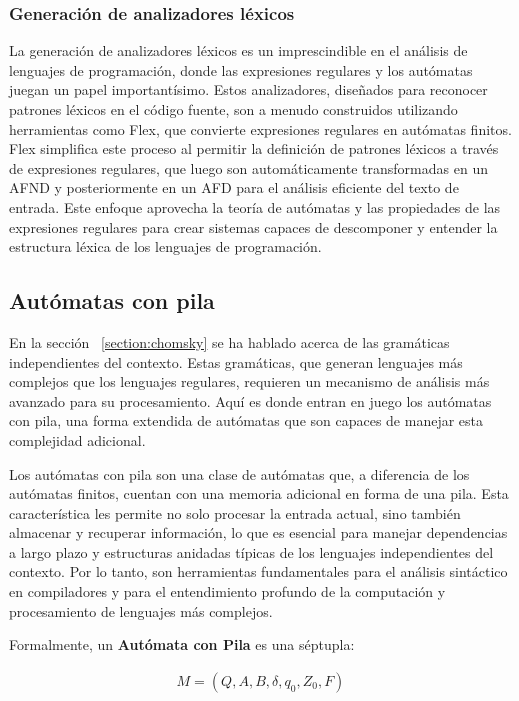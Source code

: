 \subsubsection{Generación de analizadores léxicos}\label{subsubsection:}
La generación de analizadores léxicos es un imprescindible en el análisis de lenguajes de programación, donde las expresiones regulares y los autómatas juegan un papel importantísimo. Estos analizadores, diseñados para reconocer patrones léxicos en el código fuente, son a menudo construidos utilizando herramientas como Flex, que convierte expresiones regulares en autómatas finitos. Flex simplifica este proceso al permitir la definición de patrones léxicos a través de expresiones regulares, que luego son automáticamente transformadas en un AFND y posteriormente en un AFD para el análisis eficiente del texto de entrada. Este enfoque aprovecha la teoría de autómatas y las propiedades de las expresiones regulares para crear sistemas capaces de descomponer y entender la estructura léxica de los lenguajes de programación.

\subsection{Autómatas con pila}\label{subsection:automatPila}
En la sección ~\ref{section:chomsky} se ha hablado acerca de las gramáticas independientes del contexto. Estas gramáticas, que generan lenguajes más complejos que los lenguajes regulares, requieren un mecanismo de análisis más avanzado para su procesamiento. Aquí es donde entran en juego los autómatas con pila, una forma extendida de autómatas que son capaces de manejar esta complejidad adicional.

Los autómatas con pila son una clase de autómatas que, a diferencia de los autómatas finitos, cuentan con una memoria adicional en forma de una pila. Esta característica les permite no solo procesar la entrada actual, sino también almacenar y recuperar información, lo que es esencial para manejar dependencias a largo plazo y estructuras anidadas típicas de los lenguajes independientes del contexto. Por lo tanto, son herramientas fundamentales para el análisis sintáctico en compiladores y para el entendimiento profundo de la computación y procesamiento de lenguajes más complejos.



\noindent
Formalmente, un \textbf{Autómata con Pila} es una séptupla:

\begin{align*}
    M = (Q,A,B,\delta,q_0,Z_0,F)
\end{align*}

